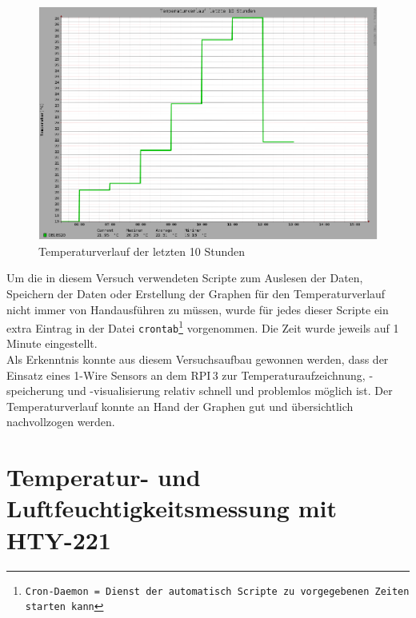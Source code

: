 \begin{figure}[!h] 
  \centering
     \includegraphics[scale=.28]{BilderAllgemein/TemperaturTag.png}
  \caption{Temperaturverlauf der letzten 10 Stunden}
  \label{Abb_Temperaturverlauf_10Stunden_DS18S20}
\end{figure}

Um die in diesem Versuch verwendeten Scripte zum Auslesen der Daten, Speichern der Daten oder Erstellung der Graphen für den Temperaturverlauf nicht immer von \glqq Hand\grqq ausführen zu müssen, wurde für jedes dieser Scripte ein extra Eintrag in der Datei \texttt{crontab\footnote{Cron-Daemon = Dienst der automatisch Scripte zu vorgegebenen Zeiten starten kann}} vorgenommen. Die Zeit wurde jeweils auf 1 Minute eingestellt.\\
Als Erkenntnis konnte aus diesem Versuchsaufbau gewonnen werden, dass der Einsatz eines 1-Wire Sensors an dem \ac{RPI}\,3 zur Temperaturaufzeichnung, -speicherung und -visualisierung relativ schnell und problemlos möglich ist. Der Temperaturverlauf konnte an Hand der Graphen gut und übersichtlich nachvollzogen werden. 

























\newpage
\section{Temperatur- und Luftfeuchtigkeitsmessung mit HTY-221}
\label{section_HTY221}

